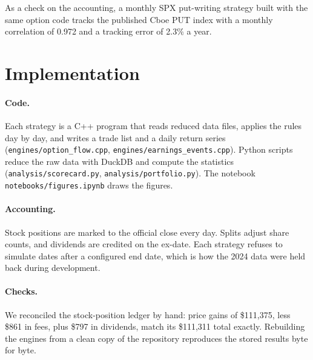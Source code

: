\documentclass[11pt]{article}
\begin{document}
As a check on the accounting, a monthly SPX put-writing strategy built with the same option code tracks the published Cboe PUT index with a monthly correlation of 0.972 and a tracking error of 2.3\% a year.

\section{Implementation}\label{app:impl}

\paragraph{Code.} Each strategy is a C++ program that reads reduced data files, applies the rules day by day, and writes a trade list and a daily return series (\texttt{engines/option\_flow.cpp}, \texttt{engines/earnings\_events.cpp}). Python scripts reduce the raw data with DuckDB and compute the statistics (\texttt{analysis/scorecard.py}, \texttt{analysis/portfolio.py}). The notebook \texttt{notebooks/figures.ipynb} draws the figures.

\paragraph{Accounting.} Stock positions are marked to the official close every day. Splits adjust share counts, and dividends are credited on the ex-date. Each strategy refuses to simulate dates after a configured end date, which is how the 2024 data were held back during development.

\paragraph{Checks.} We reconciled the stock-position ledger by hand: price gains of \$111,375, less \$861 in fees, plus \$797 in dividends, match its \$111,311 total exactly. Rebuilding the engines from a clean copy of the repository reproduces the stored results byte for byte.


\end{document}
